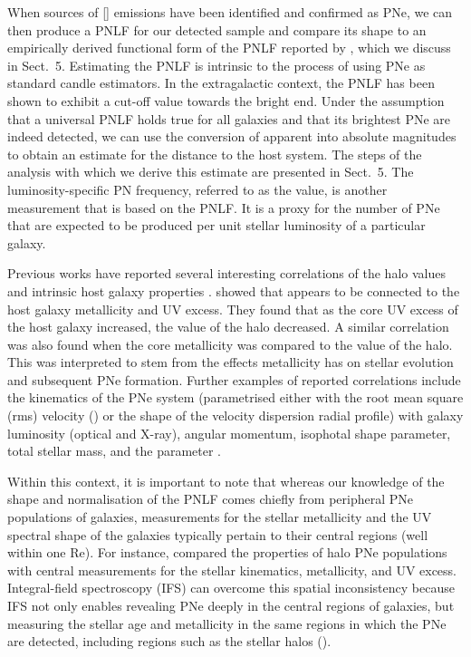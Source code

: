 \documentclass{aa}
\begin{document}
When sources of [] emissions have been identified and confirmed as PNe, we can then produce a PNLF for our detected sample and compare its shape to an empirically derived functional form of the PNLF reported by \citet{ciardullo_planetary_1989}, which we discuss in Sect.~5. Estimating the PNLF is intrinsic to the process of using PNe as standard candle estimators. In the extragalactic context, the PNLF has been shown to exhibit a cut-off value towards the bright end. Under the assumption that a universal PNLF holds true for all galaxies and that its brightest PNe are indeed detected, we can use the conversion of apparent into absolute magnitudes to obtain an estimate for the distance to the host system. The steps of the analysis with which we derive this estimate are presented in Sect.~5. The luminosity-specific PN frequency, referred to as the  value, is another measurement that is based on the PNLF. It is a proxy for the number of PNe that are expected to be produced per unit stellar luminosity of a particular galaxy. 

Previous works have reported several interesting correlations of the halo  values and intrinsic host galaxy properties \citep{buzzoni_planetary_2006, coccato_kinematic_2009, cortesi_planetary_2013}. \citet{buzzoni_planetary_2006} showed that  appears to be connected to the host galaxy metallicity and UV excess. They found that as the core UV excess of the host galaxy increased, the  value of the halo decreased. A similar correlation was also found when the core metallicity was compared to the  value of the halo. This was interpreted to stem from the effects metallicity has on stellar evolution and subsequent PNe formation. Further examples of reported correlations include the kinematics of the PNe system (parametrised either with the root mean square (rms) velocity () or the shape of the velocity dispersion radial profile) with galaxy luminosity (optical and X-ray), angular momentum, isophotal shape parameter, total stellar mass, and the  parameter \citep{coccato_kinematic_2009}. 


Within this context, it is important to note that whereas our knowledge of the shape and normalisation of the PNLF comes chiefly from peripheral PNe populations of galaxies, measurements for the stellar metallicity and the UV spectral shape of the galaxies typically pertain to their central regions (well within one Re). For instance, \citet{buzzoni_planetary_2006} compared the properties of halo PNe populations with central measurements for the stellar kinematics, metallicity, and UV excess.
Integral-field spectroscopy (IFS) can overcome this spatial inconsistency because IFS not only enables revealing PNe deeply in the central regions of galaxies, but measuring the stellar age and metallicity in the same regions in which the PNe are detected, including regions such as the stellar halos  (\citet[first illustrated by][]{weijmans_stellar_2009}).
\end{document}
